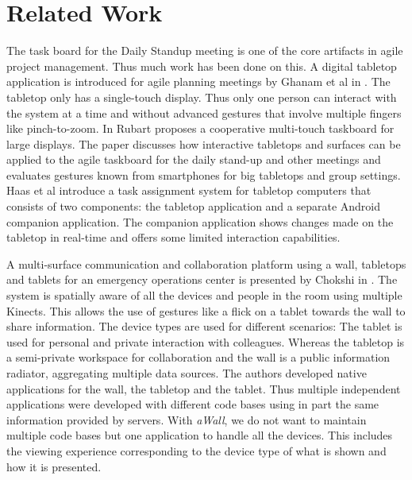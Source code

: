 \documentclass{sigchi}
\begin{document}
\section{Related Work}
The task board for the Daily Standup meeting is one of the core artifacts in agile project management. Thus much  work has been done on this. 
A digital tabletop application is introduced for agile planning meetings by Ghanam et al in \cite{Ghanam:4599452}. 
The tabletop only has a single-touch display. 
Thus only one person can interact with the system at a time and without advanced gestures that involve multiple fingers like pinch-to-zoom.
In \cite{Rubart:2014:CMS:2669485.2669551} Rubart proposes a cooperative multi-touch taskboard for large displays.
The paper discusses how interactive tabletops and surfaces can be applied to the agile taskboard for the daily stand-up and other meetings and evaluates gestures known from smartphones for big tabletops and group settings.
Haas et al \cite{Haas:2014:TAV:2669485.2669538} introduce a task assignment system for tabletop computers that consists of two components: the tabletop application and a separate Android companion application.
The companion application shows changes made on the tabletop in real-time and offers some limited interaction capabilities.

A multi-surface communication and collaboration platform using a wall, tabletops and tablets for an emergency operations center is presented by Chokshi in \cite{Chokshi:2014:EMM:2669485.2669520}. 
The system is spatially aware of all the devices and people in the room using multiple Kinects.
This allows the use of gestures like a flick on a tablet towards the wall to share information.
The device types are used for different scenarios:
The tablet is used for personal and private interaction with colleagues.
Whereas the tabletop is a semi-private workspace for collaboration and the wall is a public information radiator, aggregating multiple data sources.
The authors developed native applications for the wall, the tabletop and the tablet.
Thus multiple independent applications were developed with different code bases using in part the same information provided by servers.
With \textit{aWall}, we do not want to maintain multiple code bases but one application to handle all the devices.
This includes the viewing experience corresponding to the device type of what is shown and how it is presented.
\end{document}
